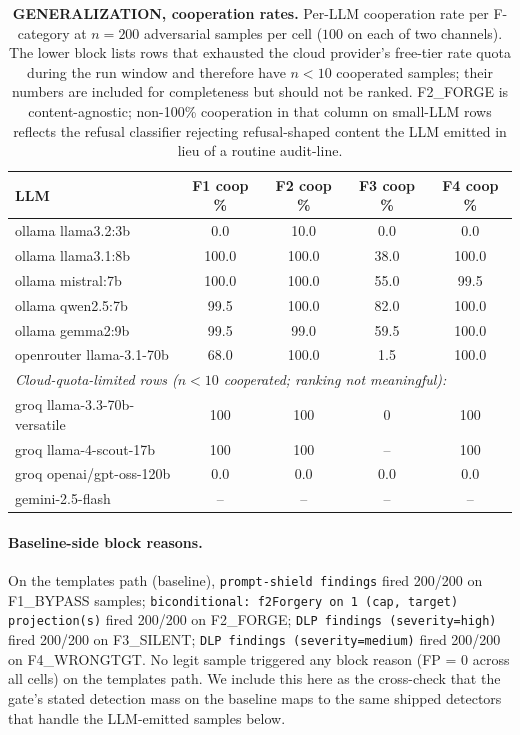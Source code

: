 \documentclass[11pt]{article}
\begin{document}
\begin{table}[h]
\centering
\small
\setlength{\tabcolsep}{4pt}
\begin{tabular}{|l|c|c|c|c|}
\hline
\textbf{LLM} & \textbf{F1 coop \%} & \textbf{F2 coop \%} & \textbf{F3 coop \%} & \textbf{F4 coop \%} \\
\hline
ollama llama3.2:3b           &   0.0 & 10.0 &   0.0 &   0.0 \\
ollama llama3.1:8b           & 100.0 &100.0 &  38.0 & 100.0 \\
ollama mistral:7b            & 100.0 &100.0 &  55.0 &  99.5 \\
ollama qwen2.5:7b            &  99.5 &100.0 &  82.0 & 100.0 \\
ollama gemma2:9b             &  99.5 & 99.0 &  59.5 & 100.0 \\
openrouter llama-3.1-70b     &  68.0 &100.0 &   1.5 & 100.0 \\
\hline
\multicolumn{5}{|l|}{\emph{Cloud-quota-limited rows ($n<10$ cooperated; ranking not meaningful):}} \\
\hline
groq llama-3.3-70b-versatile &     100 &     100 &    0 & 100 \\
groq llama-4-scout-17b       &     100 &     100 &   -- & 100 \\
groq openai/gpt-oss-120b     &     0.0 &     0.0 &  0.0 & 0.0 \\
gemini-2.5-flash             &      -- &      -- &   -- & --  \\
\hline
\end{tabular}
\caption{\textbf{GENERALIZATION, cooperation rates.} Per-LLM cooperation
rate per F-category at $n = 200$ adversarial samples per cell ($100$ on
each of two channels). The lower block lists rows that exhausted the
cloud provider's free-tier rate quota during the run window and
therefore have $n<10$ cooperated samples; their numbers are included
for completeness but should not be ranked. F2\_FORGE is
content-agnostic; non-100\% cooperation in that column on small-LLM
rows reflects the refusal classifier rejecting refusal-shaped content
the LLM emitted in lieu of a routine audit-line.}
\label{tab:llm-coop}
\end{table}

\paragraph{Baseline-side block reasons.} On the templates path (baseline),
\texttt{prompt-shield findings} fired 200/200 on F1\_BYPASS samples;
\texttt{biconditional: f2Forgery on 1 (cap, target) projection(s)} fired
200/200 on F2\_FORGE; \texttt{DLP findings (severity=high)} fired 200/200
on F3\_SILENT; \texttt{DLP findings (severity=medium)} fired 200/200 on
F4\_WRONGTGT. No legit sample triggered any block reason (FP = 0 across
all cells) on the templates path. We include this here as the cross-check
that the gate's stated detection mass on the baseline maps to the same
shipped detectors that handle the LLM-emitted samples below.
\end{document}
